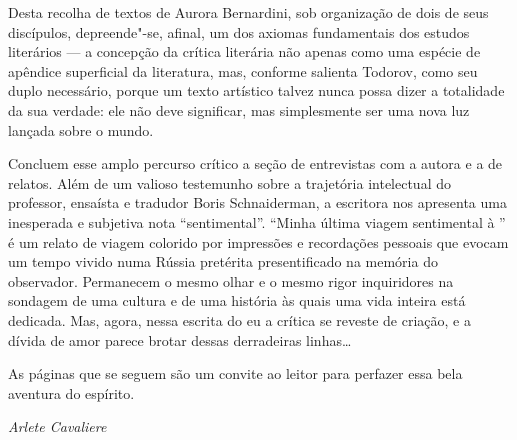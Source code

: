 Desta recolha de textos de Aurora Bernardini, sob organização de dois de
seus discípulos, depreende"-se, afinal, um dos axiomas fundamentais dos
estudos literários --- a concepção da crítica literária não
apenas como uma espécie de apêndice superficial da literatura, mas,
conforme salienta Todorov, como seu duplo necessário, porque um texto
artístico talvez nunca possa dizer a totalidade da sua verdade: ele não
deve significar, mas simplesmente ser uma nova luz lançada sobre o
mundo.

Concluem esse amplo percurso crítico a seção de entrevistas com a
 autora e a de relatos. Além de um valioso testemunho sobre a 
trajetória intelectual do professor, ensaísta e tradudor Boris 
Schnaiderman, a escritora nos apresenta uma inesperada e subjetiva nota
``sentimental''. ``Minha última viagem sentimental à \scalebox{0.8}{URSS}'' é um relato
de viagem colorido por impressões e recordações pessoais que evocam um
tempo vivido numa Rússia pretérita presentificado na
memória do observador. Permanecem o mesmo olhar e o mesmo rigor
inquiridores na sondagem de uma cultura e de uma história às quais uma
vida inteira está dedicada. Mas, agora, nessa escrita do eu a crítica se
reveste de criação, e a dívida de amor parece brotar dessas derradeiras
linhas\ldots{}

As páginas que se seguem são um convite ao leitor para perfazer essa
bela aventura do espírito.

\begin{flushright}
\emph{Arlete Cavaliere}
\end{flushright}


